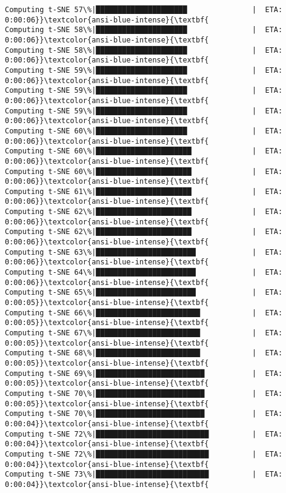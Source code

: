 \documentclass[11pt]{article}
\begin{document}
\begin{Verbatim}[commandchars=\\\{\}]
Computing t-SNE 57\%|█████████████████████               |  ETA: 0:00:06}}\textcolor{ansi-blue-intense}{\textbf{
Computing t-SNE 58\%|█████████████████████               |  ETA: 0:00:06}}\textcolor{ansi-blue-intense}{\textbf{
Computing t-SNE 58\%|█████████████████████               |  ETA: 0:00:06}}\textcolor{ansi-blue-intense}{\textbf{
Computing t-SNE 59\%|█████████████████████               |  ETA: 0:00:06}}\textcolor{ansi-blue-intense}{\textbf{
Computing t-SNE 59\%|█████████████████████               |  ETA: 0:00:06}}\textcolor{ansi-blue-intense}{\textbf{
Computing t-SNE 59\%|█████████████████████               |  ETA: 0:00:06}}\textcolor{ansi-blue-intense}{\textbf{
Computing t-SNE 60\%|█████████████████████               |  ETA: 0:00:06}}\textcolor{ansi-blue-intense}{\textbf{
Computing t-SNE 60\%|██████████████████████              |  ETA: 0:00:06}}\textcolor{ansi-blue-intense}{\textbf{
Computing t-SNE 60\%|██████████████████████              |  ETA: 0:00:06}}\textcolor{ansi-blue-intense}{\textbf{
Computing t-SNE 61\%|██████████████████████              |  ETA: 0:00:06}}\textcolor{ansi-blue-intense}{\textbf{
Computing t-SNE 62\%|██████████████████████              |  ETA: 0:00:06}}\textcolor{ansi-blue-intense}{\textbf{
Computing t-SNE 62\%|██████████████████████              |  ETA: 0:00:06}}\textcolor{ansi-blue-intense}{\textbf{
Computing t-SNE 63\%|███████████████████████             |  ETA: 0:00:06}}\textcolor{ansi-blue-intense}{\textbf{
Computing t-SNE 64\%|███████████████████████             |  ETA: 0:00:06}}\textcolor{ansi-blue-intense}{\textbf{
Computing t-SNE 65\%|███████████████████████             |  ETA: 0:00:05}}\textcolor{ansi-blue-intense}{\textbf{
Computing t-SNE 66\%|████████████████████████            |  ETA: 0:00:05}}\textcolor{ansi-blue-intense}{\textbf{
Computing t-SNE 67\%|████████████████████████            |  ETA: 0:00:05}}\textcolor{ansi-blue-intense}{\textbf{
Computing t-SNE 68\%|████████████████████████            |  ETA: 0:00:05}}\textcolor{ansi-blue-intense}{\textbf{
Computing t-SNE 69\%|█████████████████████████           |  ETA: 0:00:05}}\textcolor{ansi-blue-intense}{\textbf{
Computing t-SNE 70\%|█████████████████████████           |  ETA: 0:00:05}}\textcolor{ansi-blue-intense}{\textbf{
Computing t-SNE 70\%|█████████████████████████           |  ETA: 0:00:04}}\textcolor{ansi-blue-intense}{\textbf{
Computing t-SNE 72\%|██████████████████████████          |  ETA: 0:00:04}}\textcolor{ansi-blue-intense}{\textbf{
Computing t-SNE 72\%|██████████████████████████          |  ETA: 0:00:04}}\textcolor{ansi-blue-intense}{\textbf{
Computing t-SNE 73\%|██████████████████████████          |  ETA: 0:00:04}}\textcolor{ansi-blue-intense}{\textbf{

\end{Verbatim}
\end{document}
